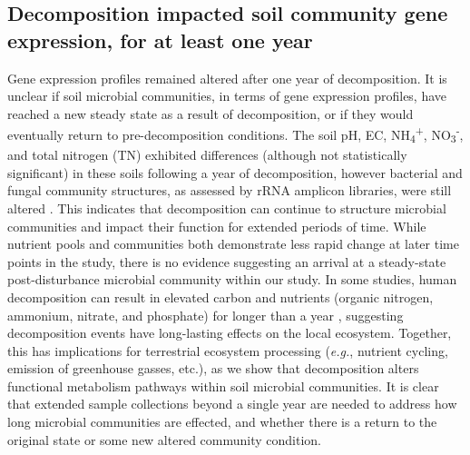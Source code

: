 \documentclass[
  sn-nature,
  lineno, referee]{sn-jnl}
\begin{document}
\subsection{Decomposition impacted soil community gene expression, for
at least one
year}\label{decomposition-impacted-soil-community-gene-expression-for-at-least-one-year}

Gene expression profiles remained altered after one year of
decomposition. It is unclear if soil microbial communities, in terms of
gene expression profiles, have reached a new steady state as a result of
decomposition, or if they would eventually return to pre-decomposition
conditions. The soil pH, EC, NH\textsubscript{4}\textsuperscript{+},
NO\textsubscript{3}\textsuperscript{-}, and total nitrogen (TN)
exhibited differences (although not statistically significant) in these
soils following a year of decomposition, however bacterial and fungal
community structures, as assessed by rRNA amplicon libraries, were still
altered \citep{taylor_transient_2024}. This indicates that decomposition
can continue to structure microbial communities and impact their
function for extended periods of time. While nutrient pools and
communities both demonstrate less rapid change at later time points in
the study, there is no evidence suggesting an arrival at a steady-state
post-disturbance microbial community within our study. In some studies,
human decomposition can result in elevated carbon and nutrients (organic
nitrogen, ammonium, nitrate, and phosphate) for longer than a year
\citep{debruyn_carrion_2024}, suggesting decomposition events have
long-lasting effects on the local ecosystem. Together, this has
implications for terrestrial ecosystem processing (\emph{e.g.}, nutrient
cycling, emission of greenhouse gasses, etc.), as we show that
decomposition alters functional metabolism pathways within soil
microbial communities. It is clear that extended sample collections
beyond a single year are needed to address how long microbial
communities are effected, and whether there is a return to the original
state or some new altered community condition.
\end{document}
